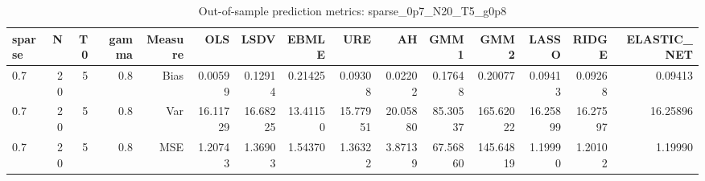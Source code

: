 \begin{table}[!htbp]\centering
\caption{Out-of-sample prediction metrics: sparse_0p7_N20_T5_g0p8}
\label{tab:table3_sparse_0p7_N20_T5_g0p8}
\begin{tabular}{lrrrrrrrrrrrrrr}
\hline
sparse & N & T0 & gamma & Measure & OLS & LSDV & EBMLE & URE & AH & GMM1 & GMM2 & LASSO & RIDGE & ELASTIC_NET \\
\hline
0.7 & 20 & 5 & 0.8 & Bias & 0.00599 & 0.12914 & 0.21425 & 0.09308 & 0.02202 & 0.17648 & 0.20077 & 0.09413 & 0.09268 & 0.09413 \\
0.7 & 20 & 5 & 0.8 & Var & 16.11729 & 16.68225 & 13.41150 & 15.77951 & 20.05880 & 85.30537 & 165.62022 & 16.25899 & 16.27597 & 16.25896 \\
0.7 & 20 & 5 & 0.8 & MSE & 1.20743 & 1.36903 & 1.54370 & 1.36322 & 3.87139 & 67.56860 & 145.64819 & 1.19990 & 1.20102 & 1.19990 \\
\hline
\end{tabular}
\end{table}

